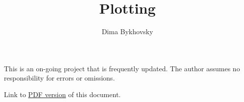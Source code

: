 \documentclass[a4paper,12pt,oneside]{scrartcl}
\numberwithin{equation}{section}
\theoremstyle{goal}
\begin{document}
\title{Plotting}
\author{Dima Bykhovsky}
\maketitle

\noindent This is an on-going project that is frequently updated. The author assumes no responsibility for errors or omissions.

\doclicenseLongText

\setcounter{tocdepth}{1}
\tableofcontents
\begin{warpHTML}
Link to \href{plottingc.pdf}{PDF version} of this document.
\end{warpHTML}



\appendix

\end{document}
